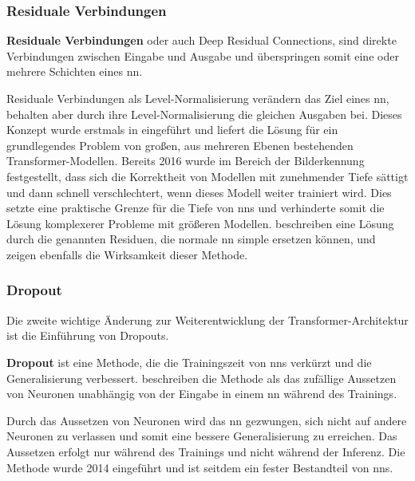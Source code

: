 \subsubsection{Residuale Verbindungen}

\begin{definition}\label{def:residuale-verbindungen}
    \textbf{Residuale Verbindungen} oder auch Deep Residual Connections, sind direkte Verbindungen zwischen Eingabe und Ausgabe und überspringen somit eine oder mehrere Schichten eines \ac{nn}.
\end{definition}
Residuale Verbindungen als Level-Normalisierung verändern das Ziel eines \ac{nn}, behalten aber durch ihre Level-Normalisierung die gleichen Ausgaben bei.
Dieses Konzept wurde erstmals in \citet{deep_residual} eingeführt und liefert die Lösung für ein grundlegendes Problem von großen, aus mehreren Ebenen bestehenden Transformer-Modellen.
Bereits 2016 wurde im Bereich der Bilderkennung festgestellt, dass sich die Korrektheit von Modellen mit zunehmender Tiefe sättigt und dann schnell verschlechtert, wenn dieses Modell weiter trainiert wird.
Dies setzte eine praktische Grenze für die Tiefe von \ac{nn}s und verhinderte somit die Lösung komplexerer Probleme mit größeren Modellen.
\citet{deep_residual} beschreiben eine Lösung durch die genannten Residuen, die normale \ac{nn} simple ersetzen können, und zeigen ebenfalls die Wirksamkeit dieser Methode.\\

\subsubsection{Dropout}

Die zweite wichtige Änderung zur Weiterentwicklung der Transformer-Architektur ist die Einführung von Dropouts.
\begin{definition}\label{def:dropout}
    \textbf{Dropout} ist eine Methode, die die Trainingszeit von \ac{nn}s verkürzt und die Generalisierung verbessert.
    \citet{dropout} beschreiben die Methode als das zufällige Aussetzen von Neuronen unabhängig von der Eingabe in einem \ac{nn} während des Trainings. 
\end{definition}
Durch das Aussetzen von Neuronen wird das \ac{nn} gezwungen, sich nicht auf andere Neuronen zu verlassen und somit eine bessere Generalisierung zu erreichen.
Das Aussetzen erfolgt nur während des Trainings und nicht während der Inferenz.
Die Methode wurde 2014 eingeführt und ist seitdem ein fester Bestandteil von \ac{nn}s.\\

